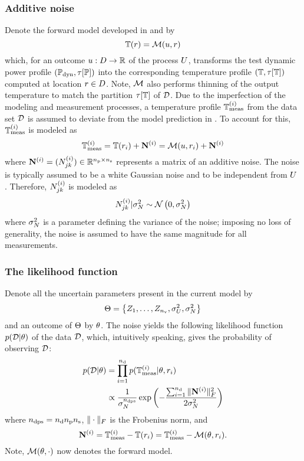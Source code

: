 \subsubsection{Additive noise}
Denote the forward model developed in  and  by
\begin{equation} \elabel{model}
  \mT(\r) = \model{\u, \r}
\end{equation}
which, for an outcome $u: D \to \mathbb{R}$ of the process $U$, transforms the test dynamic power profile $(\mathbb{P}_{\text{dyn}}, \tau[\mathbb{P}])$ into the corresponding temperature profile $\profileT$ computed at location $r \in D$. Note, $\model$ also performs thinning of the output temperature to match the partition $\tau[\mathbb{T}]$ of $\mathcal{D}$. Due to the imperfection of the modeling and measurement processes, a temperature profile $\mathbb{T}^{(i)}_{\text{meas}}$ from the data set $\mathcal{D}$ is assumed to deviate from the model prediction in . To account for this, $\mathbb{T}^{(i)}_{\text{meas}}$ is modeled as
\[
  \mT^{(i)}_\meas = \mT(\r_i) + \mnoise^{(i)} = \model{\u, \r_i} + \mnoise^{(i)}
\]
where $\mathbf{N}^{(i)} = (N^{(i)}_{jk}) \in \mathbb{R}^{{n_\text{p}} \times {n_\text{s}}}$ represents a matrix of an additive noise. The noise is typically assumed to be a white Gaussian noise and to be independent from $U$ \cite{marzouk2007, el-moselhy2012}. Therefore, $N^{(i)}_{jk}$ is modeled as
\[
  N^{(i)}_{jk} | \sigma^2_N \sim \mathcal{N}\left( 0, \sigma^2_N \right)
\]
where $\sigma^2_N$ is a parameter defining the variance of the noise; imposing no loss of generality, the noise is assumed to have the same magnitude for all measurements.

\subsubsection{The likelihood function}
Denote all the uncertain parameters present in the current model by
\[
  \Theta = \left\{ Z_1, \dotsc, Z_{n_\text{v}}, \sigma^2_U, \sigma^2_N \right\}
\]
and an outcome of $\Theta$ by $\theta$. The noise yields the following likelihood function $\f{\data | \param}$ of the data $\mathcal{D}$, which, intuitively speaking, gives the probability of observing $\mathcal{D}$:
\begin{align}
  \f{\data | \param} & = \prod_{i = 1}^{\ndata} \f{\mT^{(i)}_\meas| \param, \r_i}  \elabel{likelihood} \\
  & \propto \frac{1}{\sigma_\noise^\ndcs} \exp\left( -\frac{\sum_{i = 1}^\ndata \fnorm{\mnoise^{(i)}}^2}{2 \sigma^2_\noise} \right) \nonumber
\end{align}
where ${n_\text{dps}} = {n_\text{d}} {n_\text{p}} {n_\text{s}}$, $\| \cdot \|_F$ is the Frobenius norm, and
\[
  \mnoise^{(i)} = \mT^{(i)}_{\meas} - \mT(\r_i) = \mT^{(i)}_{\meas} - \model{\param, \r_i}.
\]
Note, $\model{\param, \cdot}$ now denotes the forward model.

